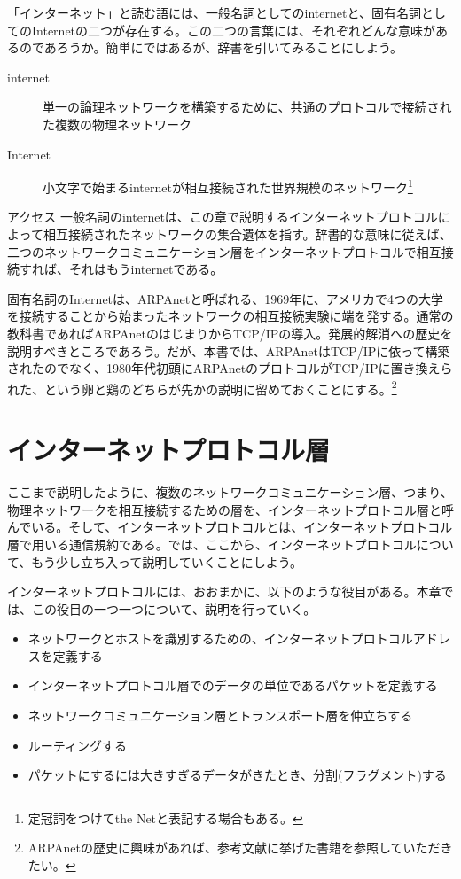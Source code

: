 「インターネット」と読む語には、一般名詞としてのinternetと、固有名詞としてのInternetの二つが存在する。この二つの言葉には、それぞれどんな意味があるのであろうか。簡単にではあるが、辞書を引いてみることにしよう。

\begin{description}
\item[internet]単一の論理ネットワークを構築するために、共通のプロトコルで接続された複数の物理ネットワーク
\item[Internet]小文字で始まるinternetが相互接続された世界規模のネットワーク\footnote{定冠詞をつけてthe Netと表記する場合もある。}
\end{description}
アクセス
一般名詞のinternetは、この章で説明するインターネットプロトコルによって相互接続されたネットワークの集合遺体を指す。辞書的な意味に従えば、二つのネットワークコミュニケーション層をインターネットプロトコルで相互接続すれば、それはもうinternetである。

固有名詞のInternetは、ARPAnetと呼ばれる、1969年に、アメリカで4つの大学を接続することから始まったネットワークの相互接続実験に端を発する。通常の教科書であればARPAnetのはじまりからTCP/IPの導入。発展的解消への歴史を説明すべきところであろう。だが、本書では、ARPAnetはTCP/IPに依って構築されたのでなく、1980年代初頭にARPAnetのプロトコルがTCP/IPに置き換えられた、という卵と鶏のどちらが先かの説明に留めておくことにする。\footnote{ARPAnetの歴史に興味があれば、参考文献に挙げた書籍を参照していただきたい。}




\section{インターネットプロトコル層}

ここまで説明したように、複数のネットワークコミュニケーション層、つまり、物理ネットワークを相互接続するための層を、インターネットプロトコル層と呼んでいる。そして、インターネットプロトコルとは、インターネットプロトコル層で用いる通信規約である。では、ここから、インターネットプロトコルについて、もう少し立ち入って説明していくことにしよう。

インターネットプロトコルには、おおまかに、以下のような役目がある。本章では、この役目の一つ一つについて、説明を行っていく。

\begin{itemize}
\item ネットワークとホストを識別するための、インターネットプロトコルアドレスを定義する 
\item インターネットプロトコル層でのデータの単位であるパケットを定義する 
\item ネットワークコミュニケーション層とトランスポート層を仲立ちする 
\item ルーティングする
\item パケットにするには大きすぎるデータがきたとき、分割(フラグメント)する
\end{itemize}

